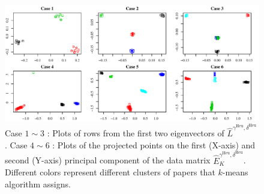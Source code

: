 \documentclass[AMS,STIX1COL]{WileyNJD-v2}
\begin{document}
{\begin{enumerate}
    \begin{figure}[htbp]
    \centering
    \includegraphics[width=1\textwidth]{Fig3.pdf}
    \caption{ Case $1\sim3$ : Plots of rows from the first two eigenvectors of $\widehat{L}^{\gamma^{\text{Heu}},\delta^{\text{Heu}}}$.
    Case $4 \sim 6$ : Plots of the projected points on the first (X-axis) and second (Y-axis) principal component of the data matrix $\widehat{E}_{K}^{\gamma^{\text{Heu}},\delta^{\text{Heu}}}$. Different colors represent different clusters of papers that $k$-means algorithm assigns.}
    \label{fig:figure3}
    \end{figure}



\end{enumerate}}
\end{document}
